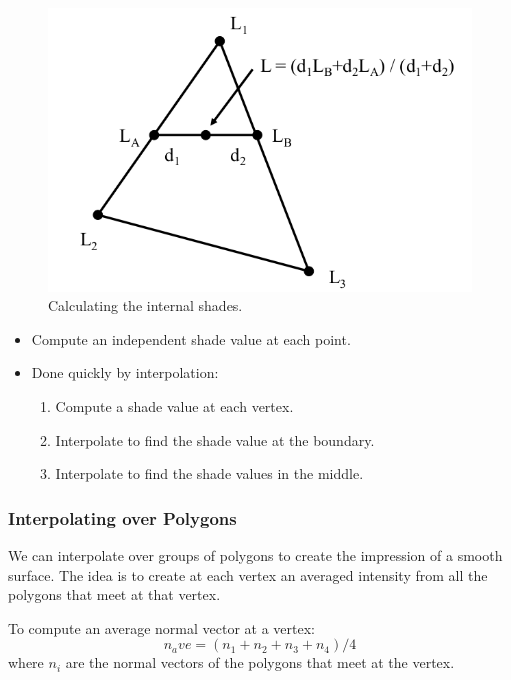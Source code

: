 \documentclass[11pt]{article}
\begin{document}
\begin{figure}[htb!]
  \centering
  \caption{Calculating the internal shades.}
  \includegraphics[scale=0.3]{interpolationinternal}
\end{figure}

\begin{itemize}
  \item Compute an independent shade value at each point.
  \item Done quickly by interpolation:
    \begin{enumerate}
      \item Compute a shade value at each vertex.
      \item Interpolate to find the shade value at the boundary.
      \item Interpolate to find the shade values in the middle.
    \end{enumerate}
\end{itemize}


\subsubsection{Interpolating over Polygons}
We can interpolate over groups of polygons to create the impression of a smooth surface.
The idea is to create at each vertex an averaged intensity from all the polygons that meet at that vertex.

To compute an average normal vector at a vertex:
\[
  n_ave = (n_1 + n_2 + n_3 + n_4) / 4
\]
where $n_i$ are the normal vectors of the polygons that meet at the vertex.
\end{document}
